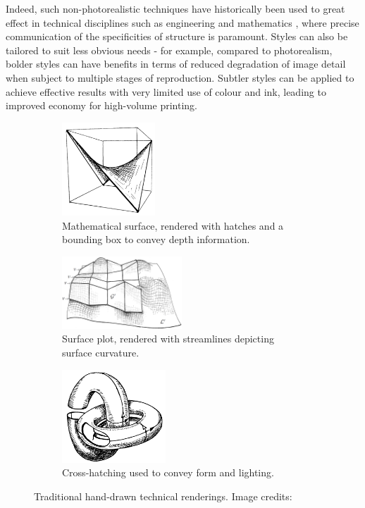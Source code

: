 Indeed, such non-photorealistic techniques have historically been used to great effect in technical disciplines such as engineering \citep{porter1988} and mathematics \citep{francis2007}, where precise communication of the specificities of structure is paramount. Styles can also be tailored to suit less obvious needs - for example, compared to photorealism, bolder styles can have benefits in terms of reduced degradation of image detail when subject to multiple stages of reproduction. Subtler styles can be applied to achieve effective results with very limited use of colour and ink, leading to improved economy for high-volume printing.

\begin{figure}[h]
	\centering
	\begin{subfigure}[b]{0.3\textwidth}
		\includegraphics[height=3.5cm]{images/ex_hand_drawn1}
		\caption{Mathematical surface, rendered with hatches and a bounding box to convey depth information.}\label{ex_hand_drawn1}
	\end{subfigure}
	\begin{subfigure}[b]{0.3\textwidth}
		\includegraphics[width=4.5cm]{images/ex_hand_drawn2}
		\caption{Surface plot, rendered with streamlines depicting surface curvature.}\label{ex_hand_drawn2}
	\end{subfigure}
	\begin{subfigure}[b]{0.3\textwidth}
		\includegraphics[height=3.5cm]{images/ex_hand_drawn3}
		\caption{Cross-hatching used to convey form and lighting.}\label{ex_hand_drawn3}
	\end{subfigure}
	\caption{Traditional hand-drawn technical renderings. Image credits: \cite{francis2007}}
\end{figure}

